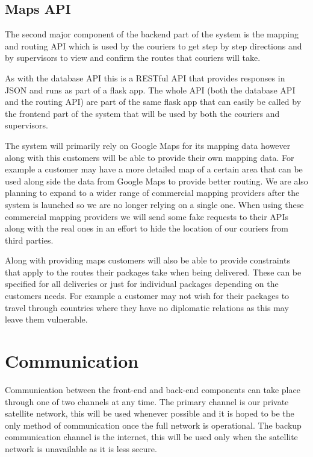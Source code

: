 \subsection{Maps API} \label{mapsarch}

The second major component of the backend part of the system is the mapping and routing API which is used by the couriers to get step by step directions and by supervisors to view and confirm the routes that couriers will take.

As with the database API this is a RESTful API that provides responses in JSON and runs as part of a flask app. The whole API (both the database API and the routing API) are part of the same flask app that can easily be called by the frontend part of the system that will be used by both the couriers and supervisors.

The system will primarily rely on Google Maps \cite{GoogleMaps} for its mapping data however along with this customers will be able to provide their own mapping data. For example a customer may have a more detailed map of a certain area that can be used along side the data from Google Maps to provide better routing. We are also planning to expand to a wider range of commercial mapping providers after the system is launched so we are no longer relying on a single one. When using these commercial mapping providers we will send some fake requests to their APIs along with the real ones in an effort to hide the location of our couriers from third parties.

Along with providing maps customers will also be able to provide constraints that apply to the routes their packages take when being delivered. These can be specified for all deliveries or just for individual packages depending on the customers needs. For example a customer may not wish for their packages to travel through countries where they have no diplomatic relations as this may leave them vulnerable.

\section{Communication} \label{communicationarch}
Communication between the front-end and back-end components can take place through one of two channels at any time. The primary channel is our private satellite network, this will be used whenever possible and it is hoped to be the only method of communication once the full network is operational. The backup communication channel is the internet, this will be used only when the satellite network is unavailable as it is less secure. 

